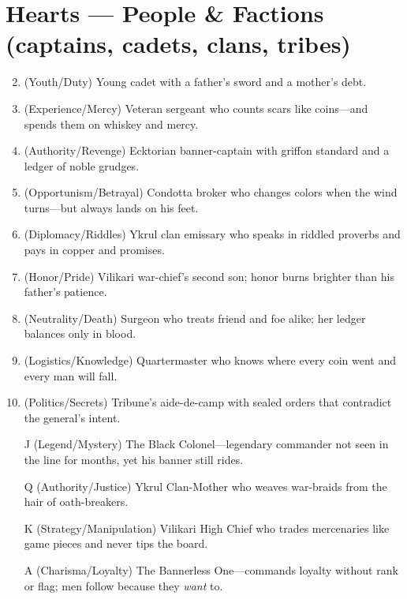 \section*{Hearts --- People \& Factions (captains, cadets, clans, tribes)}
\label{sec:black-banners-people}
\begin{enumerate}
\setcounter{enumi}{1}
\item (Youth/Duty) Young cadet with a father's sword and a mother's debt.
\item (Experience/Mercy) Veteran sergeant who counts scars like coins---and spends them on whiskey and mercy.
\item (Authority/Revenge) Ecktorian banner-captain with griffon standard and a ledger of noble grudges.
\item (Opportunism/Betrayal) Condotta broker who changes colors when the wind turns---but always lands on his feet.
\item (Diplomacy/Riddles) Ykrul clan emissary who speaks in riddled proverbs and pays in copper and promises.
\item (Honor/Pride) Vilikari war-chief's second son; honor burns brighter than his father's patience.
\item (Neutrality/Death) Surgeon who treats friend and foe alike; her ledger balances only in blood.
\item (Logistics/Knowledge) Quartermaster who knows where every coin went and every man will fall.
\item (Politics/Secrets) Tribune's aide-de-camp with sealed orders that contradict the general's intent.
\item[J] (Legend/Mystery) The Black Colonel---legendary commander not seen in the line for months, yet his banner still rides.
\item[Q] (Authority/Justice) Ykrul Clan-Mother who weaves war-braids from the hair of oath-breakers.
\item[K] (Strategy/Manipulation) Vilikari High Chief who trades mercenaries like game pieces and never tips the board.
\item[A] (Charisma/Loyalty) The Bannerless One---commands loyalty without rank or flag; men follow because they \emph{want} to.
\end{enumerate}

